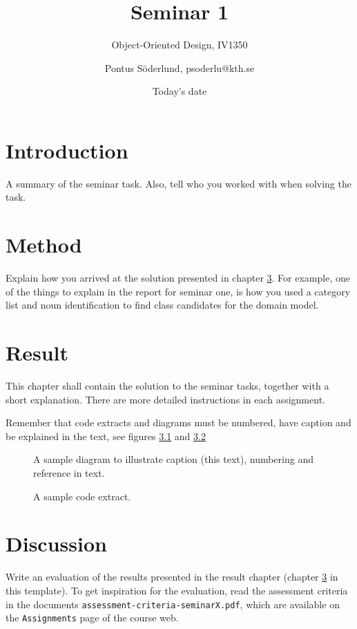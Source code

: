 \documentclass[a4paper]{scrreprt}
\title{Seminar 1}
\subtitle{Object-Oriented Design, IV1350}
\author{Pontus Söderlund, psoderlu@kth.se}
\date{Today's date}
\begin{document}
\maketitle

\tableofcontents %

\chapter{Introduction}

A summary of the seminar task. Also, tell who you worked with when solving the task. 

\chapter{Method}

Explain how you arrived at the solution presented in chapter \ref{sec:result}. For example, one of the things to explain in the report for seminar one, is how you used a category list and noun identification to find class candidates for the domain model.

\chapter{Result}
\label{sec:result}

This chapter shall contain the solution to the seminar tasks, together with a short explanation. There are more detailed instructions in each assignment.

Remember that code extracts and diagrams must be numbered, have caption and be explained in the text, see figures \ref{fig:diag} and \ref{fig:code}

\begin{figure}[h!]
  \begin{center}
    \caption{A sample diagram to illustrate caption (this text), numbering and reference in text.}
    \label{fig:diag}
  \end{center}
\end{figure}

\begin{figure}[h!]
  \begin{center}
    \caption{A sample code extract.}
    \label{fig:code}
  \end{center}
\end{figure}

\chapter{Discussion}

Write an evaluation of the results presented in the result chapter (chapter \ref{sec:result} in this template). To get inspiration for the evaluation, read the assessment criteria in the documents \texttt{assessment-criteria-seminarX.pdf}, which are available on the \texttt{Assignments} page of the course web.
\end{document}
